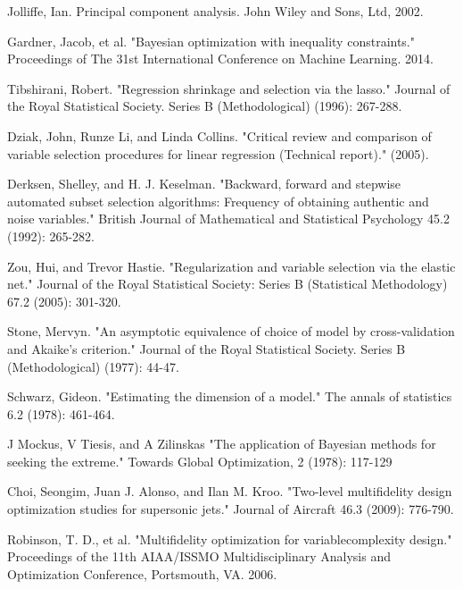 \documentclass[a4paper,onecolumn]{article}
\theoremstyle{remark}
\begin{document}
\begin{thebibliography}{9}
Jolliffe, Ian. Principal component analysis. John Wiley and Sons, Ltd, 2002.

Gardner, Jacob, et al. 
"Bayesian optimization with inequality constraints."
Proceedings of The 31st International Conference on Machine Learning. 2014.

Tibshirani, Robert. 
"Regression shrinkage and selection via the lasso." 
Journal of the Royal Statistical Society. Series B (Methodological) (1996): 267-288.

Dziak, John, Runze Li, and Linda Collins. 
"Critical review and comparison of variable selection procedures for linear regression (Technical report)." (2005).

Derksen, Shelley, and H. J. Keselman. 
"Backward, forward and stepwise automated subset selection algorithms: Frequency of obtaining authentic and noise variables." 
British Journal of Mathematical and Statistical Psychology 45.2 (1992): 265-282.

Zou, Hui, and Trevor Hastie. 
"Regularization and variable selection via the elastic net." 
Journal of the Royal Statistical Society: Series B (Statistical Methodology) 67.2 (2005): 301-320.

Stone, Mervyn. 
"An asymptotic equivalence of choice of model by cross-validation and Akaike's criterion." 
Journal of the Royal Statistical Society. Series B (Methodological) (1977): 44-47.

Schwarz, Gideon. 
"Estimating the dimension of a model." 
The annals of statistics 6.2 (1978): 461-464.

J Mockus, V Tiesis, and A Zilinskas
"The application of Bayesian methods for seeking the extreme."
Towards Global Optimization, 2 (1978): 117-129

Choi, Seongim, Juan J. Alonso, and Ilan M. Kroo. 
"Two-level multifidelity design optimization studies for supersonic jets." 
Journal of Aircraft 46.3 (2009): 776-790.


Robinson, T. D., et al. 
"Multifidelity optimization for variablecomplexity design."
Proceedings of the 11th AIAA/ISSMO Multidisciplinary Analysis and Optimization Conference, 
Portsmouth, VA. 2006.


\end{thebibliography}
\end{document}

